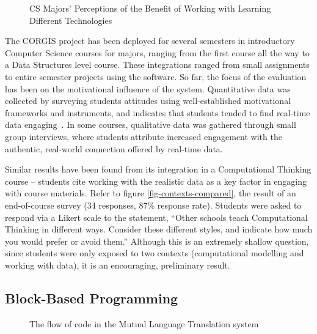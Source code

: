 \begin{figure}
		\begin{center}
		\end{center}
		\caption{CS Majors' Perceptions of the Benefit of Working with Learning Different Technologies}
		\label{fig-expected-benefit}
\end{figure}

The CORGIS project has been deployed for several semesters in introductory Computer Science courses for majors, ranging from the first course all the way to a Data Structures level course.
These integrations ranged from small assignments to entire semester projects using the software.
So far, the focus of the evaluation has been on the motivational influence of the system.
Quantitative data was collected by surveying students attitudes using well-established motivational frameworks and instruments, and indicates that students tended to find real-time data engaging~\cite{realtimeweb}.
In some courses, qualitative data was gathered through small group interviews, where students attribute increased engagement with the authentic, real-world connection offered by real-time data.

Similar results have been found from its integration in a Computational Thinking course -- students cite working with the realistic data as a key factor in engaging with course materials.
Refer to figure \ref{fig-contexts-compared}, the result of an end-of-course survey (34 responses, 87\% response rate).
Students were asked to respond via a Likert scale to the statement, ``Other schools teach Computational Thinking in different ways. Consider these different styles, and indicate how much you would prefer or avoid them.''
Although this is an extremely shallow question, since students were only exposed to two contexts (computational modelling and working with data), it is an encouraging, preliminary result.

\subsection{Block-Based Programming}

\begin{wrapfigure}{R}{0.5\textwidth}
\label{fig-mlt-overview}
\caption{The flow of code in the Mutual Language Translation system}
\end{wrapfigure}

